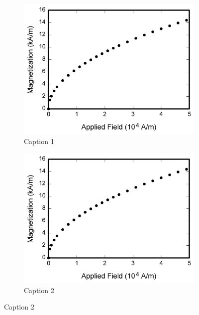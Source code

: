 \begin{figure}[htbp] %
    \centering
    \begin{subfigure}{0.45\columnwidth}
        \includegraphics[width=\linewidth]{Photos/fig1.png}
        \caption{Caption 1}
        \label{fig:2a}
    \end{subfigure}\hfill
    \begin{subfigure}{0.45\columnwidth}
        \includegraphics[width=\linewidth]{Photos/fig1.png}
        \caption{Caption 2}
        \label{fig:2b}
    \end{subfigure}


\end{figure}
